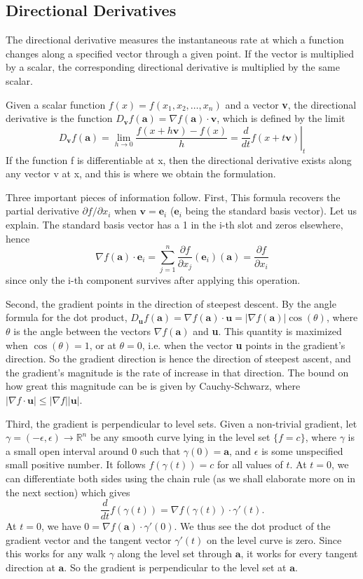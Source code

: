\documentclass{article}
\begin{document}
\subsection{Directional Derivatives}

The directional derivative measures the instantaneous rate at which a function changes along a specified vector through a given point. If the vector is multiplied by a scalar, the corresponding directional derivative is multiplied by the same scalar.

Given a scalar function $f(x)=f(x_1, x_2, \dots, x_n)$ and a vector \textbf{v}, the directional derivative is the function $D_\mathbf{v} f(\mathbf{a}) = \nabla f(\mathbf{a}) \cdot \mathbf{v}$, which is defined by the limit 
$$D_\mathbf{v} f(\mathbf{a})=\lim_{h \to 0}  \frac{f(x+h\textbf{v})-f(x)}{h}= \left. \frac{d}{dt}f(x+t\textbf{v})\right|_{t}
$$
If the function f is differentiable at x, then the directional derivative exists along any vector v at x, and this is where we obtain the formulation.

Three important pieces of information follow. First, This formula recovers the partial derivative $\partial f / \partial x_i$ when $\mathbf{v} = \mathbf{e}_i$ ($\mathbf{e}_i$ being the standard basis vector). Let us explain. The standard basis vector has a 1 in the
i-th slot and zeros elsewhere, hence 
$$\nabla f(\mathbf{a}) \cdot \mathbf{e}_i=\sum_{j=1}^{n} \frac{\partial f}{\partial x_j}(\mathbf{e}_i)(\textbf{a}) =\frac{\partial f}{\partial x_i}$$
since only the i-th component survives after applying this operation. 

Second, the gradient points in the direction of steepest descent. By the angle formula for the dot product, $D_\mathbf{u} f(\mathbf{a})=\nabla f(\mathbf{a}) \cdot \mathbf{u}=|\nabla f(\mathbf{a})|\cos(\theta)$, where $\theta$ is the angle between the vectors $\nabla f(\mathbf{a})$ and \textbf{u}. This quantity is maximized when $\cos(\theta)=1$, or at $\theta=0$, i.e. when the vector \textbf{u} points in the gradient's direction. So the gradient direction is hence the direction of steepest ascent, and the gradient's magnitude is the rate of increase in that direction. The bound on how great this magnitude can be is given by Cauchy-Schwarz, where $|\nabla f \cdot\textbf{u}| \leq |\nabla f||\textbf{u}|$.

Third, the gradient is perpendicular to level sets. Given a non-trivial gradient, let $\gamma=(-\epsilon, \epsilon) \to \mathbb{R}^n$ be any smooth curve lying in the level set $\{f=c\}$, where $\gamma$ is a small open interval around 0 such that $\gamma(0)=\textbf{a}$, and $\epsilon$ is some unspecified small positive number. It follows $f(\gamma(t))=c$ for all values of $t$. At $t=0$, we can differentiate both sides using the chain rule (as we shall elaborate more on in the next section) which gives 
$$\frac{d}{dt}f(\gamma(t))=\nabla f(\gamma(t)) \cdot \gamma '(t).$$
At $t=0$, we have $0=\nabla f(\textbf{a}) \cdot \gamma '(0)$. We thus see the dot product of the gradient vector and the tangent vector $\gamma'(t)$ on the level curve is zero. Since this works for any walk $\gamma$ along the level set through $\mathbf{a}$, it works for every tangent direction at $\mathbf{a}$. So the gradient is perpendicular to the level set at $\mathbf{a}$.
\end{document}
